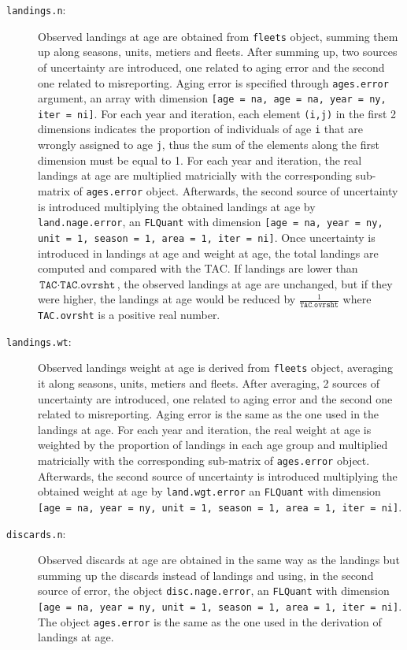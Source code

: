\begin{description}
	
	\item[\texttt{landings.n}:] Observed landings at age are obtained from \texttt{fleets} object, summing them up along seasons, units, metiers and fleets. After summing up, two sources of uncertainty are introduced, one related to aging error and the second one related to misreporting. 
	Aging error is specified through \texttt{ages.error} argument, an array with dimension \texttt{[age = na, age = na, year = ny, iter = ni]}. For each year and iteration, each element \texttt{(i,j)} in the first 2 dimensions indicates the proportion of individuals of age \texttt{i} that are wrongly assigned to age \texttt{j}, thus the sum of the elements along the first dimension must be equal to 1. For each year and iteration, the real landings at age are multiplied matricially with the corresponding sub-matrix of \texttt{ages.error} object. 
	Afterwards, the second source of uncertainty is introduced multiplying the obtained landings at age by \texttt{land.nage.error}, an \texttt{FLQuant} with dimension \texttt{[age = na, year = ny, unit = 1, season = 1, area = 1, iter = ni]}.
	Once uncertainty is introduced in landings at age and weight at age, the total landings are computed and compared with the TAC. If  landings are lower than $\texttt{TAC}\cdot\texttt{TAC.ovrsht}$, the observed landings at age are unchanged, but if they were higher, the landings at age would be reduced by $\frac{1}{\texttt{TAC.ovrsht}}$ where \texttt{TAC.ovrsht} is a positive real number.
	
	\item[\texttt{landings.wt}:] Observed landings weight at age is derived from \texttt{fleets} object, averaging it along seasons, units, metiers and fleets. After averaging, 2 sources of uncertainty are introduced, one related to aging error and the second one related to misreporting. Aging error is the same as the one used in the landings at age. For each year and iteration, the real weight at age is weighted by the proportion of landings in each age group and multiplied matricially with the corresponding sub-matrix of \texttt{ages.error} object. 
	Afterwards, the second source of uncertainty is introduced multiplying the obtained weight at age by \texttt{land.wgt.error} an \texttt{FLQuant} with dimension \texttt{[age = na, year = ny, unit = 1, season = 1, area = 1, iter = ni]}.
	
	\item[\texttt{discards.n}:] Observed discards at age are obtained in the same way as the landings but summing up the discards instead of landings and using, in the second source of error, the object \texttt{disc.nage.error}, an \texttt{FLQuant} with dimension \texttt{[age = na, year = ny, unit = 1, season = 1, area = 1, iter = ni]}.
	The object \texttt{ages.error} is the same as the one used in the derivation of landings at age.
	

\end{description}
